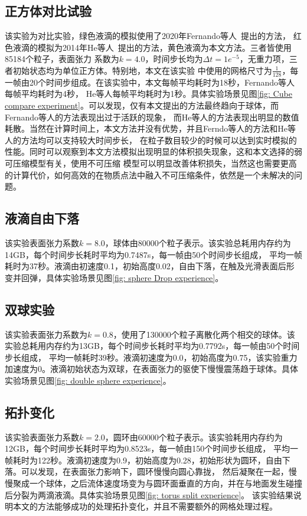 \subsection{正方体对比试验}
该实验为对比实验，绿色液滴的模拟使用了2020年Fernando等人~\cite{Zorrilla2020AcceleratingST}提出的方法，
红色液滴的模拟为2014年He等人~\cite{He2014}提出的方法，黄色液滴为本文方法。三者皆使用85184个粒子，表面张力
系数为$k = 4.0$，时间步长均为$\Delta t = 1e^{-5}$，无重力项，三者初始状态均为单位正方体。特别地，本文在该实验
中使用的网格尺寸为$\frac{1}{128}$，每一帧由20个时间步组成。在该实验中，本文每帧平均耗时为18秒，Fernando等人每帧平均耗时为4秒，
He等人每帧平均耗时为1秒。具体实验场景见图\ref{fig: Cube compare experiment}。可以发现，仅有本文提出的方法最终趋向于球体，而Fernando等人的方法表现出过于活跃的现象，
而He等人的方法表现出明显的数值耗散。当然在计算时间上，本文方法并没有优势，并且Ferndo等人的方法和He等人的方法均可以支持较大时间步长，
在粒子数目较少的时候可以达到实时模拟的性能。同时可以观察到本文方法模拟出现明显的体积损失现象，这和本文选择的弱可压缩模型有关，使用不可压缩
模型可以明显改善体积损失，当然这也需要更高的计算代价，如何高效的在物质点法中融入不可压缩条件，依然是一个未解决的问题。

\subsection{液滴自由下落}
该实验表面张力系数$k = 8.0$，球体由80000个粒子表示。该实验总耗用内存约为14GB，每个时间步长耗时平均为0.7487s，每一帧由50个时间步长组成，
平均一帧耗时为37秒。液滴由初速度0.1，初始高度0.02，自由下落，在触及光滑表面后形变并回弹，具体实验场景见图\ref{fig: sphere Drop experience}。


\subsection{双球实验}
该实验表面张力系数为$k = 0.8$，使用了130000个粒子离散化两个相交的球体。该实验总耗用内存约为13GB，每个时间步长耗时平均为0.7792s，每一帧由50个时间步长组成，
平均一帧耗时39秒。液滴初速度为0.0，初始高度为0.75，该实验重力加速度为0。液滴初始状态为双球，在表面张力的驱使下慢慢震荡趋于球体。具体实验场景见图\ref{fig: double sphere experience}。

\subsection{拓扑变化}
该实验表面张力系数$k = 2.0$，圆环由60000个粒子表示。该实验耗用内存约为12GB，每个时间步长耗时平均为0.8523s，每一帧由150个时间步长组成，
平均一帧耗时为122秒。液滴初速度为0.9，初始高度为0.28，初始形状为圆环，自由下落。可以发现，在表面张力影响下，圆环慢慢向圆心靠拢，
然后凝聚在一起，慢慢聚成一个球体，之后流体速度场变为与圆环面垂直的方向，并在与地面发生碰撞后分裂为两滴液滴。具体实验场景见图\ref{fig: torus split experience}。
该实验结果说明本文的方法能够成功的处理拓扑变化，并且不需要额外的网格处理过程。


